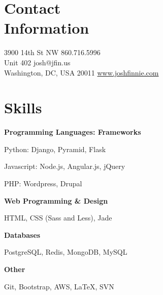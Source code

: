 \documentclass[margin,line,10pt]{resume}
\begin{document}
\begin{resume}

\section{\mysidestyle Contact\\Information\\\vspace{5pt}}

3900 14th St NW                     \hfill 860.716.5996\vspace{0mm}\\
Unit 402                            \hfill josh@jfin.us\vspace{0mm}\\
Washington, DC, USA 20011           \hfill \href{http://www.joshfinnie.com}{www.joshfinnie.com}\vspace{0mm}

\section{\mysidestyle Skills\\\vspace{5pt}}
\vspace{0mm}
\begin{multicols}{2}
    \textbf{Programming Languages: Frameworks}
    \begin{list2}
        \item Python: Django, Pyramid, Flask
        \item Javascript: Node.js, Angular.js, jQuery
        \item PHP: Wordpress, Drupal
    \end{list2}
    \textbf{Web Programming \& Design}
    \begin{list2}
        \item HTML, CSS (Sass and Less), Jade
    \end{list2}
    \columnbreak
    \textbf{Databases}
    \begin{list2}
        \item PostgreSQL, Redis, MongoDB, MySQL
    \end{list2}
    \textbf{Other}
    \begin{list2}
        \item Git, Bootstrap, AWS, \LaTeX, SVN
    \end{list2}
\end{multicols}


\end{resume}
\end{document}
